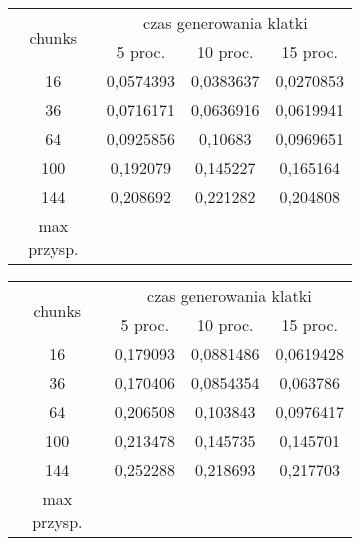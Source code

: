 \begin{figure}[!ht]
\advance\leftskip-2cm
	\begin{subfigure}{.5\textwidth}
\begin{tabular}{|c|c|c|c|} \hline
	    \multirow{2}{*}{chunks} & \multicolumn{3}{|c|}{czas generowania klatki} \\ \cline{2-4}
	 	& 5 proc. & 10 proc. & 15 proc. \\ \hline
	    16 & 0,0574393 & 0,0383637 & 0,0270853 \\ 
	    36 & 0,0716171 & 0,0636916 & 0,0619941 \\
		64 & 0,0925856 & 0,10683 & 0,0969651 \\
		100 & 0,192079 & 0,145227 & 0,165164 \\
		144 & 0,208692 & 0,221282 & 0,204808 \\ \hline
		max przysp. & & & \\
		\hline
\end{tabular}
	\end{subfigure}
	\hspace{2cm}
	\begin{subfigure}{.5\textwidth}
\begin{tabular}{|c|c|c|c|} \hline
	    \multirow{2}{*}{chunks} & \multicolumn{3}{|c|}{czas generowania klatki} \\ \cline{2-4}
	 	& 5 proc. & 10 proc. & 15 proc. \\ \hline
	    16 & 0,179093 & 0,0881486 & 0,0619428 \\ 
	    36 & 0,170406 & 0,0854354 & 0,063786 \\
		64 & 0,206508 & 0,103843 & 0,0976417 \\
		100 & 0,213478 & 0,145735 & 0,145701 \\
		144 & 0,252288 & 0,218693 & 0,217703 \\ \hline
		max przysp. & & & \\
		\hline
\end{tabular}
	\end{subfigure}
\end{figure}
